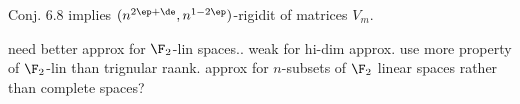 Conj. 6.8 implies $(n^{2\ep+\de},n^{1-2\ep})$-rigidit of matrices $V_m$.


need better approx for $\F_2$-lin spaces.. weak for hi-dim approx.
use more property of $\F_2$-lin than trignular raank.
approx for $n$-subsets of $\F_2$ linear spaces rather than complete spaces?
